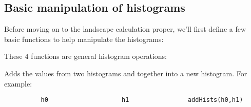
\subsection{Basic manipulation of histograms}

Before moving on to the landscape calculation proper, we'll first define a few basic functions to help manipulate the histograms:

These 4 functions are general histogram operations:
\begin{description}[style=nextline]
    \item[\code{addHists}]
        Adds the values from two histograms  and  together into a new histogram. For example:
\begin{verbatim}
          h0                    h1                addHists(h0,h1)


\end{verbatim}
\end{description}
